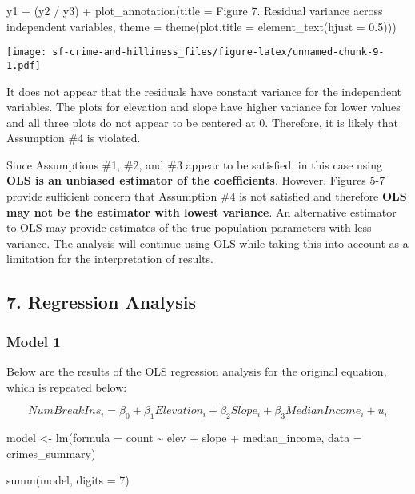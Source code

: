 \documentclass[
]{article}
\newenvironment{Shaded}{\begin{snugshade}}{\end{snugshade}}
\newcommand{\AttributeTok}[1]{\textcolor[rgb]{0.77,0.63,0.00}{#1}}
\newcommand{\DecValTok}[1]{\textcolor[rgb]{0.00,0.00,0.81}{#1}}
\newcommand{\FloatTok}[1]{\textcolor[rgb]{0.00,0.00,0.81}{#1}}
\newcommand{\FunctionTok}[1]{\textcolor[rgb]{0.00,0.00,0.00}{#1}}
\newcommand{\NormalTok}[1]{#1}
\newcommand{\OtherTok}[1]{\textcolor[rgb]{0.56,0.35,0.01}{#1}}
\newcommand{\SpecialCharTok}[1]{\textcolor[rgb]{0.00,0.00,0.00}{#1}}
\newcommand{\StringTok}[1]{\textcolor[rgb]{0.31,0.60,0.02}{#1}}
\begin{document}
\begin{Shaded}
\begin{Highlighting}[]
\NormalTok{y1 }\SpecialCharTok{+}\NormalTok{ (y2 }\SpecialCharTok{/}\NormalTok{ y3) }\SpecialCharTok{+} \FunctionTok{plot\_annotation}\NormalTok{(}\AttributeTok{title =} \StringTok{\textquotesingle{}Figure 7. Residual variance across independent variables\textquotesingle{}}\NormalTok{,}
                                         \AttributeTok{theme =} \FunctionTok{theme}\NormalTok{(}\AttributeTok{plot.title =} \FunctionTok{element\_text}\NormalTok{(}\AttributeTok{hjust =} \FloatTok{0.5}\NormalTok{)))}
\end{Highlighting}
\end{Shaded}

\texttt{[image: sf-crime-and-hilliness\_files/figure-latex/unnamed-chunk-9-1.pdf]}

It does not appear that the residuals have constant variance for the
independent variables. The plots for elevation and slope have higher
variance for lower values and all three plots do not appear to be
centered at 0. Therefore, it is likely that Assumption \#4 is violated.

Since Assumptions \#1, \#2, and \#3 appear to be satisfied, in this case
using \textbf{OLS is an unbiased estimator of the coefficients}.
However, Figures 5-7 provide sufficient concern that Assumption \#4 is
not satisfied and therefore \textbf{OLS may not be the estimator with
lowest variance}. An alternative estimator to OLS may provide estimates
of the true population parameters with less variance. The analysis will
continue using OLS while taking this into account as a limitation for
the interpretation of results.

\hypertarget{regression-analysis}{%
\subsection{7. Regression Analysis}\label{regression-analysis}}

\hypertarget{model-1}{%
\subsubsection{Model 1}\label{model-1}}

Below are the results of the OLS regression analysis for the original
equation, which is repeated below:

\[NumBreakIns_i = \beta_0 + \beta_1Elevation_i + \beta_2Slope_i + \beta_3MedianIncome_i + u_i\]

\begin{Shaded}
\begin{Highlighting}[]
\NormalTok{model }\OtherTok{\textless{}{-}} \FunctionTok{lm}\NormalTok{(}\AttributeTok{formula =}\NormalTok{ count }\SpecialCharTok{\textasciitilde{}}\NormalTok{ elev }\SpecialCharTok{+}\NormalTok{ slope }\SpecialCharTok{+}\NormalTok{ median\_income, }\AttributeTok{data =}\NormalTok{ crimes\_summary)}

\FunctionTok{summ}\NormalTok{(model, }\AttributeTok{digits =} \DecValTok{7}\NormalTok{) }
\end{Highlighting}
\end{Shaded}
\end{document}
